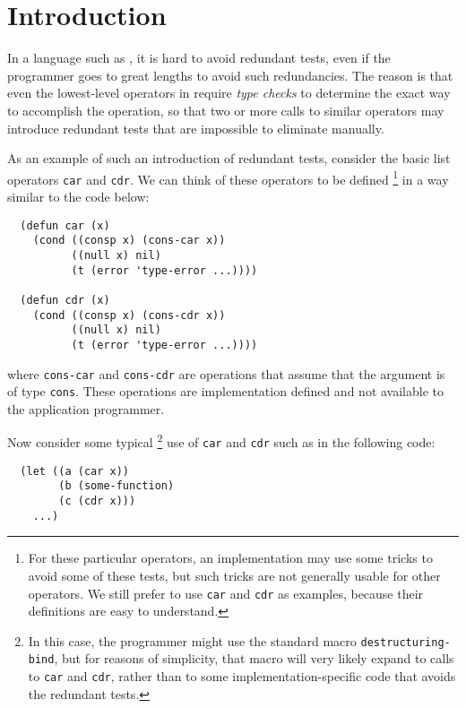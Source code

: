 \section{Introduction}
\label{sec-introduction}

In a language such as \commonlisp{}, it is hard to avoid redundant
tests, even if the programmer goes to great lengths to avoid such
redundancies.  The reason is that even the lowest-level operators in
\commonlisp{} require \emph{type checks} to determine the exact way to
accomplish the operation, so that two or more calls to similar
operators may introduce redundant tests that are impossible to
eliminate manually.

As an example of such an introduction of redundant tests, consider the
basic list operators \texttt{car} and \texttt{cdr}.  We can think of
these operators to be defined%
\footnote{For these particular operators, an implementation may use
  some tricks to avoid some of these tests, but such tricks are not
  generally usable for other operators.  We still prefer to use
  \texttt{car} and \texttt{cdr} as examples, because their definitions
  are easy to understand.}
in a way similar to the code below:

\begin{verbatim}
  (defun car (x)
    (cond ((consp x) (cons-car x))
          ((null x) nil)
          (t (error 'type-error ...))))

  (defun cdr (x)
    (cond ((consp x) (cons-cdr x))
          ((null x) nil)
          (t (error 'type-error ...))))
\end{verbatim}

\noindent
where \texttt{cons-car} and \texttt{cons-cdr} are operations that
assume that the argument is of type \texttt{cons}.  These operations
are implementation defined and not available to the application
programmer.

Now consider some typical%
\footnote{In this case, the programmer might use the standard macro
  \texttt{destructuring-bind}, but for reasons of simplicity, that
  macro will very likely expand to calls to \texttt{car} and
  \texttt{cdr}, rather than to some implementation-specific code that
  avoids the redundant tests.}
use of \texttt{car} and \texttt{cdr} such as
in the following code:

\begin{verbatim}
  (let ((a (car x))
        (b (some-function)
        (c (cdr x)))
    ...)
\end{verbatim}

